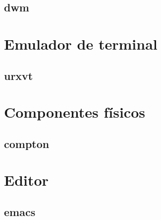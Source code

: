 \documentclass[a4paper, 11pt, titlepage]{book}
\begin{document}
        \subsection{dwm}

    \section{Emulador de terminal}

        \subsection{urxvt}

    \section{Componentes físicos}

        \subsection{compton}

    \section{Editor}

        \subsection{emacs}
\end{document}
